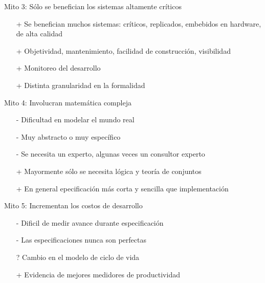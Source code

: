 \documentclass{beamer}
\begin{document}
\begin{frame}{Mito 3: S\'olo se benefician los sistemas altamente cr\'iticos}
\begin{itemize}[<+->]
\item[+] Se benefician muchos sistemas: cr\'iticos, replicados, embebidos en hardware, de alta calidad
\item[+] Objetividad, mantenimiento, facilidad de construcci\'on, visibilidad 
\item[+] Monitoreo del desarrollo
\item[+] Distinta granularidad en la formalidad
\end{itemize}
\end{frame}
 
\begin{frame}{Mito 4: Involucran matem\'atica compleja}
\begin{itemize}[<+->]
\item[-] Dificultad en modelar el mundo real
\item[-] Muy abstracto o muy espec\'ifico 
\item[-] Se necesita un experto, algunas veces un consultor experto
\item[+] Mayormente sólo se necesita l\'ogica y teor\'ia de conjuntos
\item[+] En general epecificaci\'on m\'as corta y sencilla que implementaci\'on
\end{itemize}
\end{frame}
 
\begin{frame}{Mito 5: Incrementan los costos de desarrollo}
\begin{itemize}[<+->]
\item[-] Dificil de medir avance durante especificaci\'on %
\item[-] Las especificaciones nunca son perfectas
\item[?] Cambio en el modelo de ciclo de vida %
\item[+] Evidencia de mejores medidores de productividad %
\end{itemize}
\end{frame}
 
\end{document}
